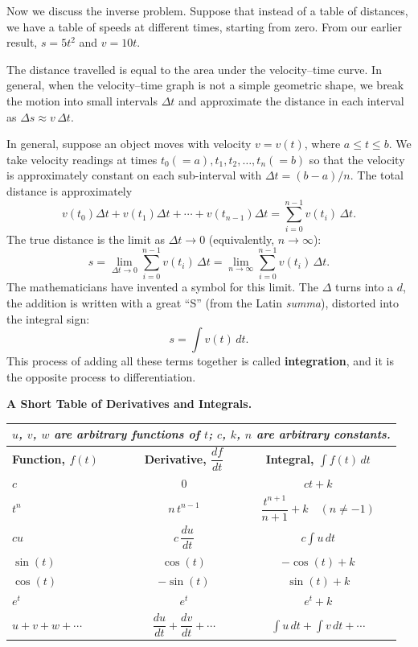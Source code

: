 Now we discuss the inverse problem. Suppose that instead of a table of distances, we have a
table of speeds at different times, starting from zero. From our earlier result, $s=5t^2$ and
$v=10t$.

The distance travelled is equal to the area under the velocity--time curve. In general, when
the velocity--time graph is not a simple geometric shape, we break the motion into small
intervals $\Delta t$ and approximate the distance in each interval as $\Delta s\approx v\,\Delta t$.

In general, suppose an object moves with velocity $v=v(t)$, where $a\le t\le b$. We take
velocity readings at times $t_0(=a),t_1,t_2,\ldots,t_n(=b)$ so that the velocity is
approximately constant on each sub-interval with $\Delta t=(b-a)/n$. The total distance
is approximately
\[
  v(t_0)\Delta t + v(t_1)\Delta t + \cdots + v(t_{n-1})\Delta t = \sum_{i=0}^{n-1}v(t_i)\,\Delta t.
\]
The true distance is the limit as $\Delta t\to 0$ (equivalently, $n\to\infty$):
\begin{equation}
  s = \lim_{\Delta t\to 0}\sum_{i=0}^{n-1}v(t_i)\,\Delta t = \lim_{n\to\infty}\sum_{i=0}^{n-1}v(t_i)\,\Delta t.
\end{equation}
The mathematicians have invented a symbol for this limit. The $\Delta$ turns into a $d$, the
addition is written with a great ``S'' (from the Latin \emph{summa}), distorted into the integral sign:
\begin{equation}
  s = \int v(t)\,dt.
\end{equation}
This process of adding all these terms together is called \textbf{integration}, and it is the
opposite process to differentiation.

\textbf{A Short Table of Derivatives and Integrals.}

\begin{center}
\begin{tabular}{lcc}
  \toprule
  \multicolumn{3}{l}{\textit{$u$, $v$, $w$ are arbitrary functions of $t$; $c$, $k$, $n$ are arbitrary constants.}} \\
  \midrule
  \textbf{Function, $f(t)$} & \textbf{Derivative, $\dfrac{df}{dt}$} & \textbf{Integral, $\displaystyle\int f(t)\,dt$} \\
  \midrule
  $c$ & $0$ & $ct+k$ \\[6pt]
  $t^n$ & $n\,t^{n-1}$ & $\dfrac{t^{n+1}}{n+1}+k \quad (n\ne -1)$ \\[6pt]
  $cu$ & $c\,\dfrac{du}{dt}$ & $c\displaystyle\int u\,dt$ \\[6pt]
  $\sin(t)$ & $\cos(t)$ & $-\cos(t)+k$ \\[4pt]
  $\cos(t)$ & $-\sin(t)$ & $\sin(t)+k$ \\[4pt]
  $e^t$ & $e^t$ & $e^t+k$ \\[4pt]
  $u+v+w+\cdots$ & $\dfrac{du}{dt}+\dfrac{dv}{dt}+\cdots$ &
    $\displaystyle\int u\,dt+\int v\,dt+\cdots$ \\
  \bottomrule
\end{tabular}
\end{center}

